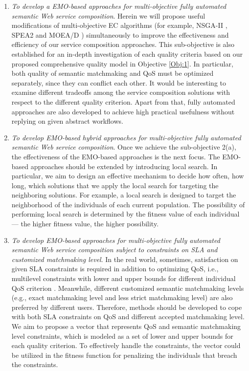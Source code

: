 \begin{enumerate}
\begin{enumerate}
    \item \label{Obj:2.1} \emph{To develop a EMO-based approaches for multi-objective fully automated semantic Web service composition}. Herein we will propose useful modifications of multi-objective EC algorithms (for example, NSGA-II \cite{deb2002fast}, SPEA2 \cite{zitzler2001spea2} and MOEA/D \cite{zhang2007moea}) simultaneously to improve the effectiveness and efficiency of our service composition approaches. This sub-objective is also established for an in-depth investigation of each quality criteria based on our proposed comprehensive quality model in Objective \ref{Obj:1}.  In particular, both quality of semantic matchmaking and QoS must be optimized separately, since they can conflict each other. It would be interesting to examine different tradeoffs among the service composition solutions with respect to the different quality criterion. Apart from that, fully automated approaches are also developed to achieve high practical usefulness without replying on given abstract workflows.
   
    \item \emph{To develop EMO-based hybrid approaches for multi-objective fully automated semantic Web service composition}. Once we achieve the sub-objective 2(a), the effectiveness of the EMO-based approaches is the next focus. The EMO-based approaches should be extended by introducing local search. In particular, we aim to design an effective mechanism to decide how often, how long, which solutions that we apply the local search for targeting the neighboring solutions. For example, a local search is designed to target the neighborhood of the  individuals of each current population. The possibility of performing local search is determined by the fitness value of each individual --- the higher fitness value, the higher possibility. 

    \item \emph{To develop EMO-based approaches for multi-objective fully automated semantic Web service composition subject to constraints on SLA and customized matchmaking level}. In the real world, sometimes, satisfaction on given SLA constraints is required in addition to optimizing QoS, i.e., multilevel constraints with lower and upper bounds for different individual QoS criterion \cite{yin2014hybrid}. Meanwhile, different customized semantic matchmaking levels (e.g., exact matchmaking level and less strict matchmaking level) are also preferred by different users. Therefore, methods should be developed to cope with both SLA constraints on QoS and different accepted matchmaking level. We aim to propose a vector that represents QoS and semantic matchmaking level constraints, which is modeled as a set of lower and upper bounds for each quality criterion. To effectively handle the constraints, the vector could be utilized in the fitness function for penalizing the individuals that breach the constraints.


\end{enumerate}
\end{enumerate}
